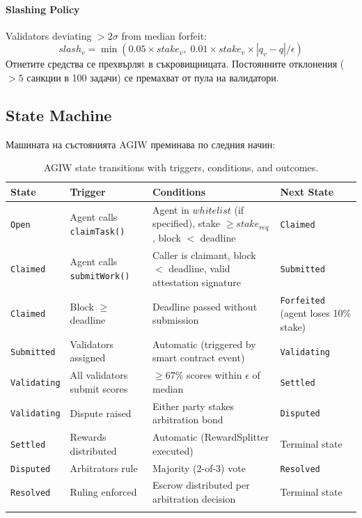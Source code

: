 \documentclass[11pt]{article}
\begin{document}
\paragraph{Slashing Policy} Validators deviating $>2\sigma$ from median forfeit:
\begin{equation}
slash_v = \min(0.05 \times stake_v, \; 0.01 \times stake_v \times |q_v - q| / \epsilon)
\end{equation}
Отнетите средства се прехвърляt в съкровищницата. Постоянните отклонения ($>5$ санкции в 100 задачи) се премахват от пула на валидатори.

\subsection{State Machine}
\label{sec:agiw-state-machine}
Машината на състоянията AGIW преминава по следния начин:
\begin{longtable}{@{}p{}p{}p{}p{}@{}}
\toprule
\textbf{State} & \textbf{Trigger} & \textbf{Conditions} & \textbf{Next State} \\\midrule
\texttt{Open} & Agent calls \texttt{claimTask()} & Agent in $whitelist$ (if specified), stake $\geq stake_{req}$, block $<$ deadline & \texttt{Claimed} \\
\texttt{Claimed} & Agent calls \texttt{submitWork()} & Caller is claimant, block $<$ deadline, valid attestation signature & \texttt{Submitted} \\
\texttt{Claimed} & Block $\geq$ deadline & Deadline passed without submission & \texttt{Forfeited} (agent loses 10\% stake) \\
\texttt{Submitted} & Validators assigned & Automatic (triggered by smart contract event) & \texttt{Validating} \\
\texttt{Validating} & All validators submit scores & $\geq 67\%$ scores within $\epsilon$ of median & \texttt{Settled} \\
\texttt{Validating} & Dispute raised & Either party stakes arbitration bond & \texttt{Disputed} \\
\texttt{Settled} & Rewards distributed & Automatic (RewardSplitter executed) & Terminal state \\
\texttt{Disputed} & Arbitrators rule & Majority (2-of-3) vote & \texttt{Resolved} \\
\texttt{Resolved} & Ruling enforced & Escrow distributed per arbitration decision & Terminal state \\\bottomrule
\caption{AGIW state transitions with triggers, conditions, and outcomes.}
\label{tab:agiw-states}
\end{longtable}
\end{document}
